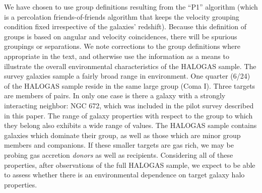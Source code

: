 \documentclass[oldversion]{aa}
\begin{document}
We have chosen to use group definitions resulting from the \citet{giuricin_etal_2000} ``P1'' algorithm (which is a percolation friends-of-friends algorithm that keeps the velocity grouping condition fixed irrespective of the galaxies' redshift). Because this definition of groups is based on angular and velocity coincidences, there will be spurious groupings or separations. We note corrections to the group definitions where appropriate in the text, and otherwise use the information as a means to illustrate the overall environmental characteristics of the HALOGAS sample. The survey galaxies sample a fairly broad range in environment. One quarter (6/24) of the HALOGAS sample reside in the same large group (Coma I). Three targets are members of pairs. In only one case is there a galaxy with a strongly interacting neighbor: NGC 672, which was included in the pilot survey described in this paper. The range of galaxy properties with respect to the group to which they belong also exhibits a wide range of values. The HALOGAS sample contains galaxies which dominate their group, as well as those which are minor group members and companions. If these smaller targets are gas rich, we may be probing gas accretion {\it donors} as well as recipients. Considering all of these properties, after observations of the full HALOGAS sample, we expect to be able to assess whether there is an environmental dependence on target galaxy halo properties.
\end{document}
